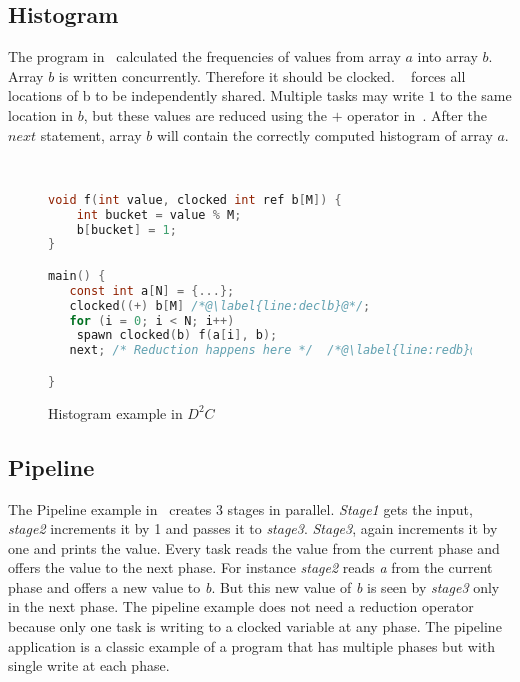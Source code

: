 \documentclass[10pt, conference, compsocconf]{IEEEtran}
\begin{document}
\subsection{Histogram}
The program in~ calculated the frequencies
of values from array $a$ 
into array $b$.
Array $b$ is written concurrently. Therefore it should be clocked.
~ forces all locations of b to be independently shared.
Multiple tasks may write $1$ to the same location in $b$, but these
values are reduced using the $+$ operator in~. After the 
$next$ statement, array $b$ will contain the correctly computed histogram
of array $a$. 

\
\begin{figure}
\begin{lstlisting}[language=C]
void f(int value, clocked int ref b[M]) {
	int bucket = value % M;
	b[bucket] = 1; 
}

main() {
   const int a[N] = {...};
   clocked((+) b[M] /*@\label{line:declb}@*/;
   for (i = 0; i < N; i++)
	spawn clocked(b) f(a[i], b); 
   next; /* Reduction happens here */  /*@\label{line:redb}@*/;

}
\end{lstlisting}
\caption{Histogram example in $D^2C$}
\label{fig:histogram}
\end{figure}

\subsection{Pipeline}
The Pipeline example in~
 creates 3 stages in parallel. \emph{Stage1} gets the input,
\emph{stage2} increments it by 1 and passes it to \emph{stage3}. 
\emph{Stage3}, again increments it by one and prints the value. Every task reads the value
from the current phase and offers the value to the next phase. 
For instance \emph{stage2} reads \emph{a} from the current phase 
and offers a new value to \emph{b}. But this new value of \emph{b} is seen by \emph{stage3} only 
in the next phase. The pipeline example does not need a reduction operator
because only one task is writing to a clocked variable at any phase. The pipeline application is a classic example
 of a program that has multiple phases but with single write at each phase.
\end{document}
